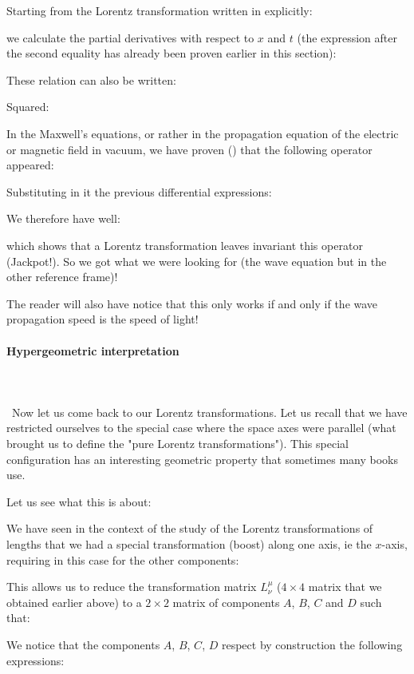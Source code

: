 	Starting from the Lorentz transformation written in explicitly:
	
	we calculate the partial derivatives with respect to $x$ and $t$ (the expression after the second equality has already been proven earlier in this section):
	
	These relation can also be written:
	
	Squared:
	
	In the Maxwell's equations, or rather in the propagation equation of the electric or magnetic field in vacuum, we have proven () that the following operator appeared:
	
	Substituting in it the previous differential expressions:
	
	We therefore have well:
	
	which shows that a Lorentz transformation leaves invariant this operator (Jackpot!). So we got what we were looking for (the wave equation but in the other reference frame)!

	The reader will also have notice that this only works if and only if the wave propagation speed is the speed of light!

	\paragraph{Hypergeometric interpretation}\mbox{}\\\\\
	Now let us come back to our Lorentz transformations. Let us recall that we have restricted ourselves to the special case where the space axes were parallel (what brought us to define the "pure Lorentz transformations"). This special configuration has an interesting geometric property that sometimes many books use.

	Let us see what this is about:
	
	We have seen in the context of the study of the Lorentz transformations of lengths that we had a special transformation (boost) along one axis, ie the $x$-axis, requiring in this case for the other components:
	
	This allows us to  reduce the transformation matrix $L_\nu^\mu$ ($4\times 4$ matrix that we obtained earlier above) to a $2\times 2$ matrix of components $A$, $B$, $C$ and $D$ such that:
	
	We notice that the components $A$, $B$, $C$, $D$ respect by construction the following expressions:
	
